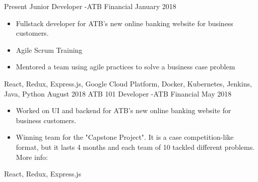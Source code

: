 
\begin{experiences}
  \experience
    {Present}   {Junior Developer -}{ATB Financial}{}
    {January 2018} {
                      \begin{itemize}
                        \item Fullstack developer for ATB's new online banking website for business customers.
                        \item Agile Scrum Training
                        \item Mentored a team using agile practices to solve a business case problem
                      \end{itemize}
                    }
                    {
                        React,
                        Redux,
                        Express.js,
                        Google Cloud Platform,
                        Docker,
                        Kubernetes,
                        Jenkins,
                        Java,
                        Python
                    }
  \emptySeparator
  \experience
  {August 2018}   {ATB 101 Developer -}{ATB Financial}{}
  {May 2018} {
                    \begin{itemize}
                      \item Worked on UI and backend for ATB's new online banking website for business customers.
                      \item Winning team for the "Capstone Project". It is a case competition-like format,
                      but it lasts 4 months and each team of 10 tackled different problems.
                      More info: 
                    \end{itemize}
                  }
                  {
                      React,
                      Redux,
                      Express.js
                  }
\end{experiences}

